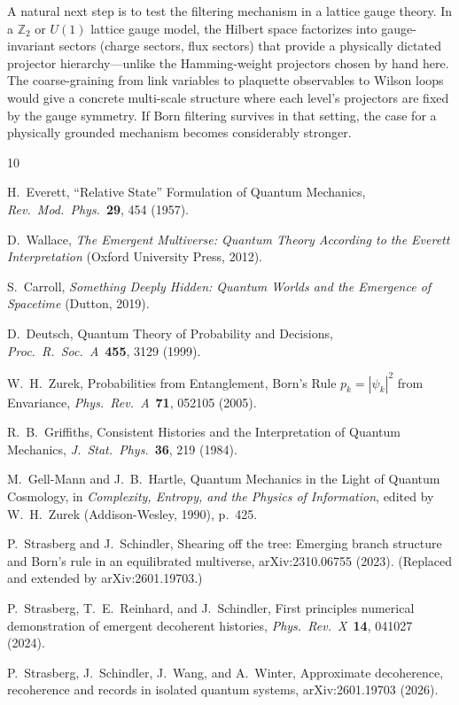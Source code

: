 \documentclass[aps,prd,twocolumn,showpacs,preprintnumbers,amsmath,amssymb,nofootinbib]{revtex4-2}
\begin{document}
A natural next step is to test the filtering mechanism in a lattice gauge theory.
In a $\mathbb{Z}_2$ or $U(1)$ lattice gauge model, the Hilbert space factorizes
into gauge-invariant sectors (charge sectors, flux sectors) that provide a
physically dictated projector hierarchy---unlike the Hamming-weight projectors
chosen by hand here.  The coarse-graining from link variables to plaquette
observables to Wilson loops would give a concrete multi-scale structure where
each level's projectors are fixed by the gauge symmetry.  If Born filtering
survives in that setting, the case for a physically grounded mechanism becomes
considerably stronger.



\begin{thebibliography}{10}

H.~Everett,
``Relative State'' Formulation of Quantum Mechanics,
\emph{Rev.\ Mod.\ Phys.}\ \textbf{29}, 454 (1957).

D.~Wallace,
\emph{The Emergent Multiverse: Quantum Theory According to the Everett
  Interpretation}
(Oxford University Press, 2012).

S.~Carroll,
\emph{Something Deeply Hidden: Quantum Worlds and the Emergence of
  Spacetime}
(Dutton, 2019).

D.~Deutsch,
Quantum Theory of Probability and Decisions,
\emph{Proc.\ R.\ Soc.\ A}\ \textbf{455}, 3129 (1999).

W.~H.~Zurek,
Probabilities from Entanglement, Born's Rule $p_k = |\psi_k|^2$ from
  Envariance,
\emph{Phys.\ Rev.\ A}\ \textbf{71}, 052105 (2005).

R.~B.~Griffiths,
Consistent Histories and the Interpretation of Quantum Mechanics,
\emph{J.\ Stat.\ Phys.}\ \textbf{36}, 219 (1984).

M.~Gell-Mann and J.~B.~Hartle,
Quantum Mechanics in the Light of Quantum Cosmology,
in \emph{Complexity, Entropy, and the Physics of
  Information}, edited by W.~H.~Zurek
(Addison-Wesley, 1990), p.~425.

P.~Strasberg and J.~Schindler,
Shearing off the tree: Emerging branch structure and Born's rule in
  an equilibrated multiverse,
arXiv:2310.06755 (2023).
(Replaced and extended by arXiv:2601.19703.)

P.~Strasberg, T.~E.~Reinhard, and J.~Schindler,
First principles numerical demonstration of emergent decoherent
  histories,
\emph{Phys.\ Rev.\ X}\ \textbf{14}, 041027 (2024).

P.~Strasberg, J.~Schindler, J.~Wang, and A.~Winter,
Approximate decoherence, recoherence and records in isolated quantum
  systems,
arXiv:2601.19703 (2026).

\end{thebibliography}
\end{document}
